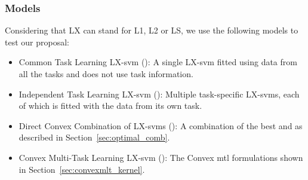 \subsubsection*{Models}
Considering that {LX} can stand for {L1}, {L2} or {LS}, we use the following models to test our proposal:
\begin{itemize}
    \item {Common Task Learning LX-\acrshort{svm} ()}: A single LX-\acrshort{svm} fitted using data from all the tasks and does not use task information.
    \item {Independent Task Learning LX-\acrshort{svm} ()}: Multiple task-specific LX-\acrshort{svm}s, each of which is fitted with the data from its own task.
    \item {Direct Convex Combination of LX-\acrshort{svm}s ()}: A combination of the best  and  as described in Section~\ref{sec:optimal_comb}.
    \item {Convex Multi-Task Learning LX-\acrshort{svm} ()}: The Convex \acrshort{mtl} formulations shown in Section~\ref{sec:convexmlt_kernel}.
\end{itemize}

